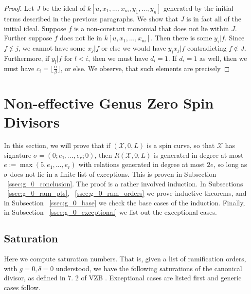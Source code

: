 \documentclass{amsart}
\theoremstyle{plain}
\theoremstyle{definition}
\theoremstyle{remark}
\numberwithin{equation}{section}
\newcommand\ssec{\subsection}
\newcommand \sx{\mathscr X}
\begin{document}
\begin{proof}
Let $J$ be the ideal of $k[u, x_1, \ldots, x_m, y_1, \ldots, y_n]$ generated by the initial terms described in the previous paragraphs.  We show that $J$ is in fact all of the initial ideal.  Suppose $f$ is a non-constant monomial that does not lie within $J$.  Further suppose $f$ does not lie in $k[u, x_1, \ldots, x_m]$.  Then there is some $y_i|f$.  Since $f\not\in j$, we cannot have some $x_j|f$ or else we would have $y_ix_j|f$ contradicting $f\not\in J$.  Furthermore, if $y_l|f$ for $l<i$, then we must have $d_l=1$.  If $d_i=1$ as well, then we must have $c_i=\lfloor \frac{\alpha}{\beta}\rfloor$, or else.  We observe, that such elements are precisely 

\end{proof}



\section{Non-effective Genus Zero Spin Divisors}
\label{sec:g_0_non_effective}


In this section, we will prove that if $(\sx , 0, L)$ is a spin curve,
so that $\sx$ has signature $\sigma = (0; e_1, \ldots , e_r; 0)$, then
$R(\sx , 0, L)$ is generated in degree at most $e := \max(5, e_1, \ldots,
e_r)$ with relations generated in degree at most $2e$, so long as $\sigma$
does not lie in a finite list of exceptions. This is proven in
Subsection ~\ref{ssec:g_0_conclusion}. The proof is a rather
involved induction. In Subsections ~\ref{ssec:g_0_ram_pts},
~\ref{ssec:g_0_ram_orders} we prove inductive theorems, and in
Subsection ~\ref{ssec:g_0_base} we check the base cases of the
induction. Finally, in Subsection ~\ref{ssec:g_0_exceptional} we
list out the exceptional cases.

\ssec{Saturation}
\label{ssec:g_0_saturation} 
Here we compute saturation numbers. That is, given a list of
ramification orders, with $g = 0,\delta = 0$ understood, we have
the following saturations of the canonical divisor, as defined in 7.
2 of VZB \cite{vzb:stacky}. Exceptional cases are listed first
and generic cases follow.

\end{document}
